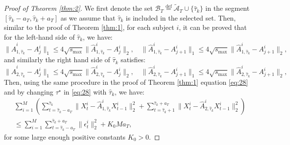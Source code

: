 \documentclass[11pt]{article}
\begin{document}
\begin{proof}[Proof of Theorem \ref{thm:2}]
We first denote the set $\mathcal{B}_T \overset{\text{def}}{=} \widetilde{\mathcal{A}}_T \cup \{\widehat{\tau}_k\}$ in the segment $[\widehat{\tau}_k-a_T, \widehat{\tau}_k+a_T]$ as we assume that $\widehat{\tau}_k$ is included in the selected set. 
Then, similar to the proof of Theorem \ref{thm:1}, for each subject $i$, it can be proved that for the left-hand side of $\widehat{\tau}_k$, we have:
\begin{equation*}
    \|\widehat{A}^i_{1,\widehat{\tau}_k} - A^i_j\|_1 \leq 4\sqrt{s_{\max}}\|\widehat{A}^i_{1,\widehat{\tau}_k} - A^i_j\|_2, \quad \|\widehat{A}^i_{1,\widehat{\tau}_k} - A^i_{j+1}\|_1 \leq 4\sqrt{s_{\max}}\|\widehat{A}^i_{1,\widehat{\tau}_k} - A^i_{j+1}\|_2,
\end{equation*}
and similarly the right hand side of $\widehat{\tau}_k$ satisfies:
\begin{equation*}
    \|\widehat{A}^i_{2,\widehat{\tau}_k} - A^i_{j}\|_1 \leq 4\sqrt{s_{\max}}\|\widehat{A}^i_{2,\widehat{\tau}_k} - A^i_{j}\|_2, \quad \|\widehat{A}^i_{2,\widehat{\tau}_k} - A^i_{j+1}\|_1 \leq 4\sqrt{s_{\max}}\|\widehat{A}^i_{2,\widehat{\tau}_k} - A^i_{j+1}\|_2,
\end{equation*}
Then, using the same procedure in the proof of Theorem \ref{thm:1} equation \eqref{eq:28} and by changing $\tau^\star$ in \eqref{eq:28} with $\widehat{\tau}_k$, we have:
\begin{equation}
    \label{eq:36}
    \begin{aligned}
        &\sum_{i=1}^M \left(\sum_{t=\widehat{\tau}_k-a_T}^{\widehat{\tau}_k}\|X_t^i - \widehat{A}_{1,\widehat{\tau}_k}^i X_{t-1}^i\|_2^2 + \sum_{t=\widehat{\tau}_k+1}^{\widehat{\tau}_k+a_T}\|X_t^i - \widehat{A}_{2,\widehat{\tau}_k}^iX_{t-1}^i\|_2^2 \right)\\
        &\leq \sum_{i=1}^M\sum_{t=\widehat{\tau}_k-a_T}^{\widehat{\tau}_k+a_T}\|\epsilon_t^i\|_2^2 + K_0M a_T,
    \end{aligned}
\end{equation}
for some large enough positive constants $K_0>0$.


\end{proof}
\end{document}
